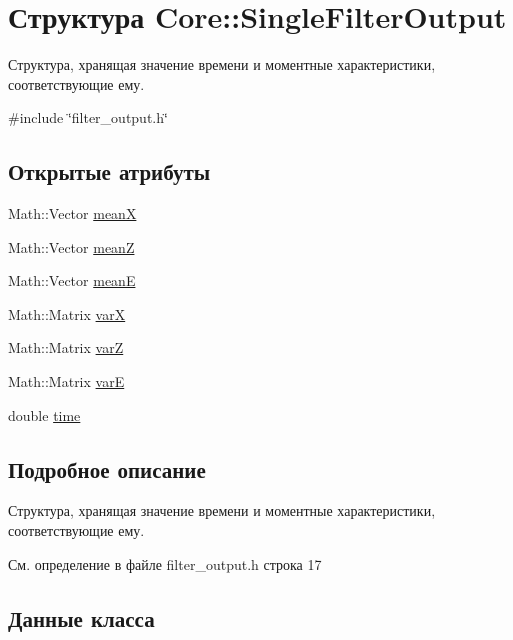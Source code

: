 \hypertarget{struct_core_1_1_single_filter_output}{}\section{Структура Core\+:\+:Single\+Filter\+Output}
\label{struct_core_1_1_single_filter_output}


Структура, хранящая значение времени и моментные характеристики, соответствующие ему.  




{\ttfamily \#include \char`\"{}filter\+\_\+output.\+h\char`\"{}}

\subsection*{Открытые атрибуты}
\begin{DoxyCompactItemize}
\item 
Math\+::\+Vector \hyperlink{struct_core_1_1_single_filter_output_aa06ff31e25433b19e09b67b290a187ca}{meanX}
\item 
Math\+::\+Vector \hyperlink{struct_core_1_1_single_filter_output_aa2350a5b96ca5ef7cdb056e091702b5d}{meanZ}
\item 
Math\+::\+Vector \hyperlink{struct_core_1_1_single_filter_output_ab8e09d89fe2c1bb1577242e950998c10}{meanE}
\item 
Math\+::\+Matrix \hyperlink{struct_core_1_1_single_filter_output_a31a2094b47d89df8ffd1befdf43d1f6e}{varX}
\item 
Math\+::\+Matrix \hyperlink{struct_core_1_1_single_filter_output_aa0b4c0793c1277fe75e19fd96dc4cde4}{varZ}
\item 
Math\+::\+Matrix \hyperlink{struct_core_1_1_single_filter_output_ab89885f694006365cd0f8e4a1bbc6187}{varE}
\item 
double \hyperlink{struct_core_1_1_single_filter_output_a4d2078c50b021df0d91e862d55619637}{time}
\end{DoxyCompactItemize}


\subsection{Подробное описание}
Структура, хранящая значение времени и моментные характеристики, соответствующие ему. 

См. определение в файле filter\+\_\+output.\+h строка 17



\subsection{Данные класса}

